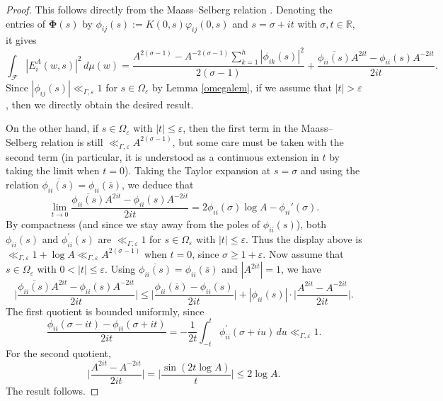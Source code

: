 \documentclass[12pt,reqno]{amsart}
\numberwithin{equation}{section}
\newcommand{\R}{\mathbb{R}}
\begin{document}
\begin{proof}
    This follows directly from the Maass--Selberg relation \cite[pg.\ 41]{SarCoh}. Denoting the entries of $\mathbf{\Phi}(s)$ by $\phi_{ij}(s) := K(0, s) \varphi_{i j}(0, s)$ and $s = \sigma + it$ with $\sigma, t \in \R$, it gives
    \begin{equation*}
        \int_\mathcal{F} |{E_i^A(w, s)}|^2 \, d\mu(w) = \frac{A^{2(\sigma - 1)} - A^{-2(\sigma-1)} \sum_{k=1}^h |{\phi_{ik}(s)}|^2}{2(\sigma-1)} + \frac{\overline{\phi_{ii}(s)} A^{2it} - \phi_{ii}(s) A^{-2it} }{2it}.
    \end{equation*}
    Since $|\phi_{ij}(s)| \ll_{\Gamma, \varepsilon} 1$ for $s \in \Omega_{\varepsilon}$ by Lemma \ref{omegalem}, if we assume that $|t| > \varepsilon$, then we directly obtain the desired result. 
    
    On the other hand, if $s \in \Omega_\varepsilon$ with $|{t}| \leq \varepsilon$, then the first term in the Maass--Selberg relation is still $\ll_{\Gamma, \varepsilon} A^{2(\sigma-1)}$, but some care must be taken with the second term (in particular, it is understood as a continuous extension in $t$ by taking the limit when $t=0$). Taking the Taylor expansion at $s=\sigma$ and using the relation $\overline{\phi_{ii}(s)} = \phi_{ii}(\overline{s})$, we deduce that
    \begin{equation*}
   \lim_{t \rightarrow 0}  \frac{\overline{\phi_{ii}(s)} A^{2it} - \phi_{ii}(s) A^{-2it} }{2it} = 2 \phi_{ii}(\sigma) \log{A} - \phi_{ii}'(\sigma).
    \end{equation*}
   By compactness (and since we stay away from the poles of $\phi_{ii}(s)$), 
   both $\phi_{ii}(s)$ and $\phi^{\prime}_{ii}(s)$ are $\ll_{\Gamma,\varepsilon} 1$
   for $s \in \Omega_\varepsilon$ with $|{t}| \leq \varepsilon$.
   Thus the display above is $\ll_{\Gamma, \varepsilon} 1+\log{A} \ll_{\Gamma, \varepsilon} A^{2(\sigma-1)}$ when $t=0$, since $\sigma \geq 1+\varepsilon$.
  Now assume that $s \in \Omega_{\varepsilon}$ with $0<|t| \leq \varepsilon$. 
  Using
\(\overline{\phi_{ii}(s)}=\phi_{ii}(\overline{s})\) and \(|A^{2it}|=1\), we have
\begin{equation*}
\Big | \frac{\overline{\phi_{ii}(s)}A^{2it}-
\phi_{ii}(s)A^{-2it}}{2it}
\Big| \leq \Big| \frac{\phi_{ii}(\overline{s})-\phi_{ii}(s)}{2it} \Big|+ |\phi_{ii}(s)| \cdot \Big | \frac{A^{2it}-A^{-2it}}{2it} \Big|.
\end{equation*}
The first quotient is bounded uniformly, since
\begin{equation*}
\frac{\phi_{ii}(\sigma-it)-\phi_{ii}(\sigma+it)}{2it}
=-\frac{1}{2t}\int_{-t}^{t} \phi_{ii}^{\prime}(\sigma+iu)\,du
\ll_{\Gamma,\varepsilon} 1.
\end{equation*}
For the second quotient, 
\begin{equation*}
\Big| \frac{A^{2it}-A^{-2it}}{2it} \Big| =\Big| \frac{\sin(2t \log A)}{t} \Big | \leq 2 \log A.
\end{equation*}
The result follows.
\end{proof}
\end{document}
